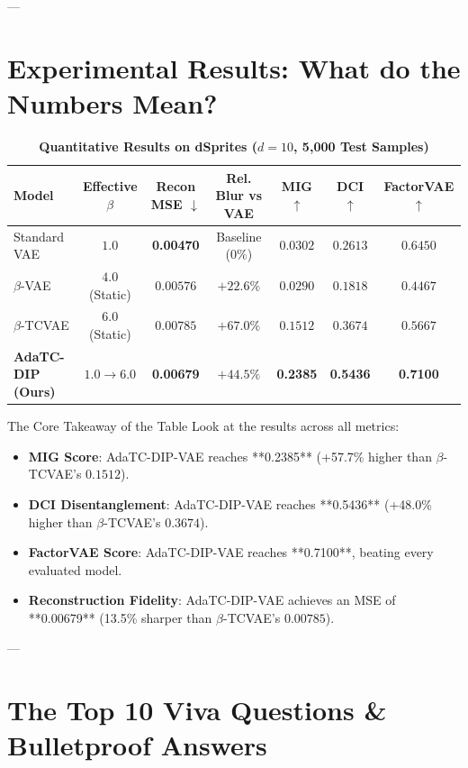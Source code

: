 \documentclass[11pt,a4paper]{article}
\begin{document}
---

\section{Experimental Results: What do the Numbers Mean?}

\begin{table}[!htbp]
\centering
\small
\caption{\textbf{Quantitative Results on dSprites ($d=10$, 5,000 Test Samples)}}
\begin{tabular}{lcccccc}
\toprule
\textbf{Model} & \textbf{Effective $\beta$} & \textbf{Recon MSE} $\downarrow$ & \textbf{Rel. Blur vs VAE} & \textbf{MIG} $\uparrow$ & \textbf{DCI} $\uparrow$ & \textbf{FactorVAE} $\uparrow$ \\
\midrule
Standard VAE & $1.0$ & \textbf{0.00470} & Baseline ($0\%$) & $0.0302$ & $0.2613$ & $0.6450$ \\
$\beta$-VAE & $4.0$ (Static) & $0.00576$ & $+22.6\%$ & $0.0290$ & $0.1818$ & $0.4467$ \\
$\beta$-TCVAE & $6.0$ (Static) & $0.00785$ & $+67.0\%$ & $0.1512$ & $0.3674$ & $0.5667$ \\
\midrule
\textbf{AdaTC-DIP (Ours)} & $1.0 \to 6.0$ & \textbf{0.00679} & \textbf{$+44.5\%$} & \textbf{0.2385} & \textbf{0.5436} & \textbf{0.7100} \\
\bottomrule
\end{tabular}
\end{table}

\begin{takeawaybox}{The Core Takeaway of the Table}
Look at the results across all metrics:
\begin{itemize}[noitemsep]
    \item \textbf{MIG Score}: AdaTC-DIP-VAE reaches **0.2385** (+57.7\% higher than $\beta$-TCVAE's $0.1512$).
    \item \textbf{DCI Disentanglement}: AdaTC-DIP-VAE reaches **0.5436** (+48.0\% higher than $\beta$-TCVAE's $0.3674$).
    \item \textbf{FactorVAE Score}: AdaTC-DIP-VAE reaches **0.7100**, beating every evaluated model.
    \item \textbf{Reconstruction Fidelity}: AdaTC-DIP-VAE achieves an MSE of **0.00679** (13.5\% sharper than $\beta$-TCVAE's $0.00785$).
\end{itemize}
\end{takeawaybox}

---

\section{The Top 10 Viva Questions \& Bulletproof Answers}
\end{document}
